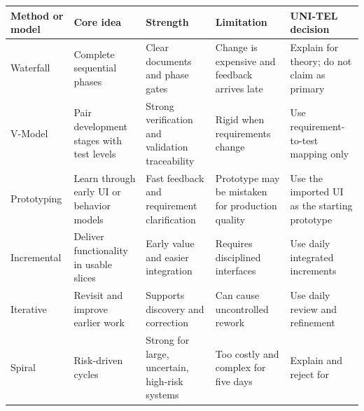 \documentclass[
  10pt,
  a4paper,
  oneside]{report}
\newcounter{none} %
\begin{document}
{\def\LTcaptype{none} %
\begin{longtable}[]{@{}
  >{\raggedright\arraybackslash}p{}
  >{\raggedright\arraybackslash}p{}
  >{\raggedright\arraybackslash}p{}
  >{\raggedright\arraybackslash}p{}
  >{\raggedright\arraybackslash}p{}@{}}
\toprule\noalign{}
\begin{minipage}[b]{\linewidth}\raggedright
Method or model
\end{minipage} & \begin{minipage}[b]{\linewidth}\raggedright
Core idea
\end{minipage} & \begin{minipage}[b]{\linewidth}\raggedright
Strength
\end{minipage} & \begin{minipage}[b]{\linewidth}\raggedright
Limitation
\end{minipage} & \begin{minipage}[b]{\linewidth}\raggedright
UNI-TEL decision
\end{minipage} \\
\midrule\noalign{}
\endhead
\bottomrule\noalign{}
\endlastfoot
Waterfall & Complete sequential phases & Clear documents and phase gates
& Change is expensive and feedback arrives late & Explain for theory; do
not claim as primary \\
V-Model & Pair development stages with test levels & Strong verification
and validation traceability & Rigid when requirements change & Use
requirement-to-test mapping only \\
Prototyping & Learn through early UI or behavior models & Fast feedback
and requirement clarification & Prototype may be mistaken for production
quality & Use the imported UI as the starting prototype \\
Incremental & Deliver functionality in usable slices & Early value and
easier integration & Requires disciplined interfaces & Use daily
integrated increments \\
Iterative & Revisit and improve earlier work & Supports discovery and
correction & Can cause uncontrolled rework & Use daily review and
refinement \\
Spiral & Risk-driven cycles & Strong for large, uncertain, high-risk
systems & Too costly and complex for five days & Explain and reject for

\end{longtable}}
\end{document}
